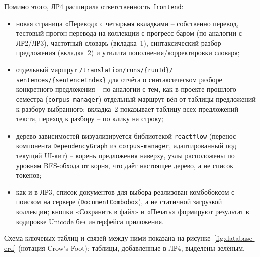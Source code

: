 Помимо этого, ЛР4 расширила ответственность \texttt{frontend}:
\begin{itemize}
  \item новая страница «Перевод» с четырьмя вкладками -- собственно
  перевод, тестовый прогон перевода на коллекции с прогресс-баром
  (по аналогии с ЛР2/ЛР3), частотный словарь (вкладка~1), синтаксический
  разбор предложения (вкладка~2) и утилита пополнения/корректировки
  словаря;
  \item отдельный маршрут \texttt{/translation/runs/\{runId\}/}\allowbreak
  \texttt{sentences/\{sentenceIndex\}} для отчёта о синтаксическом
  разборе конкретного предложения -- по аналогии с тем, как в проекте
  прошлого семестра (\texttt{corpus-manager}) отдельный маршрут вёл от
  таблицы предложений к разбору выбранного: вкладка~2 показывает
  таблицу всех предложений текста, переход к разбору -- по клику на
  строку;
  \item дерево зависимостей визуализируется библиотекой
  \texttt{reactflow} (перенос компонента \texttt{DependencyGraph} из
  \texttt{corpus-manager}, адаптированный под текущий UI-кит) --
  корень предложения наверху, узлы расположены по уровням
  BFS-обхода от корня, что даёт настоящее дерево, а не список токенов;
  \item как и в ЛР3, список документов для выбора реализован
  комбобоксом с поиском на сервере (\texttt{DocumentCombobox}), а не
  статичной загрузкой коллекции; кнопки «Сохранить в файл» и «Печать»
  формируют результат в кодировке Unicode без интерфейса приложения.
\end{itemize}


Схема ключевых таблиц и связей между ними показана на
рисунке~\ref{fig:database-erd} (нотация Crow's Foot); таблицы,
добавленные в ЛР4, выделены зелёным.


